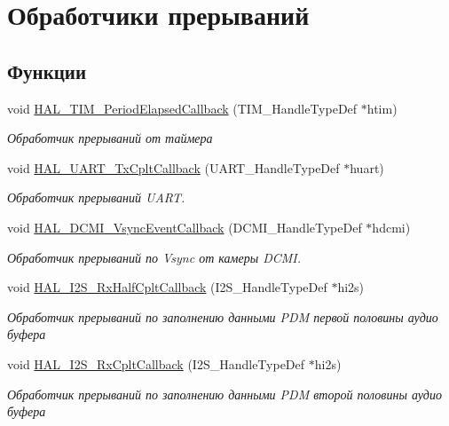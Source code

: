 \hypertarget{group___callback}{}\section{Обработчики прерываний}
\label{group___callback}
\subsection*{Функции}
\begin{DoxyCompactItemize}
\item 
void \hyperlink{group___callback_ga8a3b0ad512a6e6c6157440b68d395eac}{H\+A\+L\+\_\+\+T\+I\+M\+\_\+\+Period\+Elapsed\+Callback} (T\+I\+M\+\_\+\+Handle\+Type\+Def $\ast$htim)
\begin{DoxyCompactList}\small\item\em Обработчик прерываний от таймера \end{DoxyCompactList}\item 
void \hyperlink{group___callback_gabcdf9b59049eccbc87d54042f9235b1a}{H\+A\+L\+\_\+\+U\+A\+R\+T\+\_\+\+Tx\+Cplt\+Callback} (U\+A\+R\+T\+\_\+\+Handle\+Type\+Def $\ast$huart)
\begin{DoxyCompactList}\small\item\em Обработчик прерываний U\+A\+RT. \end{DoxyCompactList}\item 
void \hyperlink{group___callback_ga7175c4e8555aa828b9c92cb813c3416a}{H\+A\+L\+\_\+\+D\+C\+M\+I\+\_\+\+Vsync\+Event\+Callback} (D\+C\+M\+I\+\_\+\+Handle\+Type\+Def $\ast$hdcmi)
\begin{DoxyCompactList}\small\item\em Обработчик прерываний по Vsync от камеры D\+C\+MI. \end{DoxyCompactList}\item 
void \hyperlink{group___callback_ga6c4cd3b18c42c6de0c3f4fe7068a5b12}{H\+A\+L\+\_\+\+I2\+S\+\_\+\+Rx\+Half\+Cplt\+Callback} (I2\+S\+\_\+\+Handle\+Type\+Def $\ast$hi2s)
\begin{DoxyCompactList}\small\item\em Обработчик прерываний по заполнению данными P\+DM первой половины аудио буфера \end{DoxyCompactList}\item 
void \hyperlink{group___callback_ga18c33b2d429b06674ec30e5b2b81862c}{H\+A\+L\+\_\+\+I2\+S\+\_\+\+Rx\+Cplt\+Callback} (I2\+S\+\_\+\+Handle\+Type\+Def $\ast$hi2s)
\begin{DoxyCompactList}\small\item\em Обработчик прерываний по заполнению данными P\+DM второй половины аудио буфера \end{DoxyCompactList}\end{DoxyCompactItemize}


